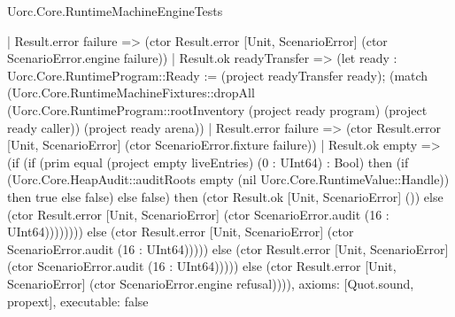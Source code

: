 \begin{lexlean}{Uorc.Core.RuntimeMachineEngineTests}
\begin{semanticmodule}
{          | Result.error failure => (ctor Result.error [Unit, ScenarioError] (ctor ScenarioError.engine failure))
          | Result.ok readyTransfer => (let ready : Uorc.Core.RuntimeProgram::Ready := (project readyTransfer ready); (match (Uorc.Core.RuntimeMachineFixtures::dropAll (Uorc.Core.RuntimeProgram::rootInventory (project ready program) (project ready caller)) (project ready arena))
            | Result.error failure => (ctor Result.error [Unit, ScenarioError] (ctor ScenarioError.fixture failure))
            | Result.ok empty => (if (if (prim equal (project empty liveEntries) (0 : UInt64) : Bool) then (if (Uorc.Core.HeapAudit::auditRoots empty (nil Uorc.Core.RuntimeValue::Handle)) then true else false) else false) then (ctor Result.ok [Unit, ScenarioError] ()) else (ctor Result.error [Unit, ScenarioError] (ctor ScenarioError.audit (16 : UInt64)))))))) else (ctor Result.error [Unit, ScenarioError] (ctor ScenarioError.audit (16 : UInt64))))) else (ctor Result.error [Unit, ScenarioError] (ctor ScenarioError.audit (16 : UInt64))))) else (ctor Result.error [Unit, ScenarioError] (ctor ScenarioError.engine refusal)))),
  axioms: [Quot.sound, propext],
  executable: false
}


\end{semanticmodule}
\end{lexlean}
